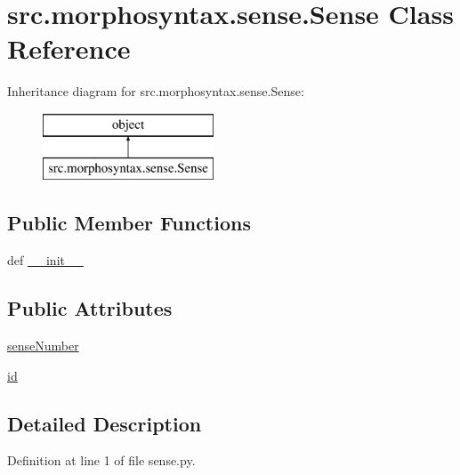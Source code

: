 \hypertarget{classsrc_1_1morphosyntax_1_1sense_1_1_sense}{\section{src.\+morphosyntax.\+sense.\+Sense Class Reference}
\label{classsrc_1_1morphosyntax_1_1sense_1_1_sense}
}
Inheritance diagram for src.\+morphosyntax.\+sense.\+Sense\+:\begin{figure}[H]
\begin{center}
\leavevmode
\includegraphics[height=2.000000cm]{classsrc_1_1morphosyntax_1_1sense_1_1_sense}
\end{center}
\end{figure}
\subsection*{Public Member Functions}
\begin{DoxyCompactItemize}
\item 
def \hyperlink{classsrc_1_1morphosyntax_1_1sense_1_1_sense_a93c1dc3b4d7bec434e2b49a56c9fe1d2}{\+\_\+\+\_\+init\+\_\+\+\_\+}
\end{DoxyCompactItemize}
\subsection*{Public Attributes}
\begin{DoxyCompactItemize}
\item 
\hyperlink{classsrc_1_1morphosyntax_1_1sense_1_1_sense_a6d3ee2cb40a0bd2a8d08ea0709364ca6}{sense\+Number}
\item 
\hyperlink{classsrc_1_1morphosyntax_1_1sense_1_1_sense_ad67ff2691bc78a27e5c781bfd88ff08e}{id}
\end{DoxyCompactItemize}


\subsection{Detailed Description}


Definition at line 1 of file sense.\+py.



